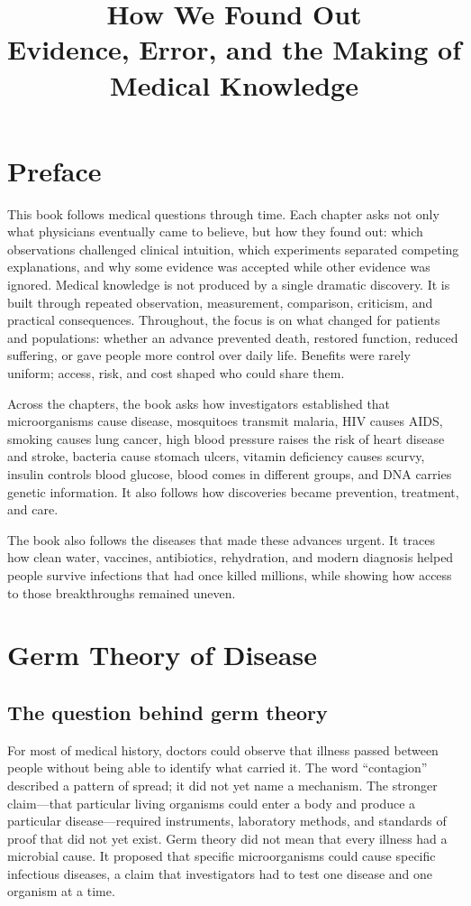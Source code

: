 \documentclass[12pt,oneside]{book}
\title{How We Found Out\\[0.5em]
\large Evidence, Error, and the Making of Medical Knowledge}
\author{}
\date{}
\begin{document}
\frontmatter
\maketitle

\chapter*{Preface}
This book follows medical questions through time. Each chapter asks not only
what physicians eventually came to believe, but how they found out: which
observations challenged clinical intuition, which experiments separated
competing explanations, and why some evidence was accepted while other evidence
was ignored. Medical knowledge is not produced by a single dramatic discovery.
It is built through repeated observation, measurement, comparison, criticism,
and practical consequences. Throughout, the focus is on what changed for
patients and populations: whether an advance prevented death, restored
function, reduced suffering, or gave people more control over daily life.
Benefits were rarely uniform; access, risk, and cost shaped who could share
them.

Across the chapters, the book asks how investigators established that
microorganisms cause disease, mosquitoes transmit malaria, HIV causes AIDS,
smoking causes lung cancer, high blood pressure raises the risk of heart disease
and stroke, bacteria cause stomach ulcers, vitamin deficiency causes scurvy,
insulin controls blood glucose, blood comes in different groups, and DNA carries
genetic information. It also follows how discoveries became
prevention, treatment, and care.

The book also follows the diseases that made these advances urgent. It traces
how clean water, vaccines, antibiotics, rehydration, and modern diagnosis
helped people survive infections that had once killed millions, while showing
how access to those breakthroughs remained uneven.

\tableofcontents

\mainmatter

\chapter[Germ Theory of Disease]{Germ Theory of Disease}

\section{The question behind germ theory}
For most of medical history, doctors could observe that illness passed between
people without being able to identify what carried it. The word ``contagion''
described a pattern of spread; it did not yet name a mechanism. The stronger
claim---that particular living organisms could enter a body and produce a
particular disease---required instruments, laboratory methods, and standards of
proof that did not yet exist. Germ theory did not mean that every illness had a
microbial cause. It proposed that specific microorganisms could cause specific
infectious diseases, a claim that investigators had to test one disease and one
organism at a time.
\end{document}
